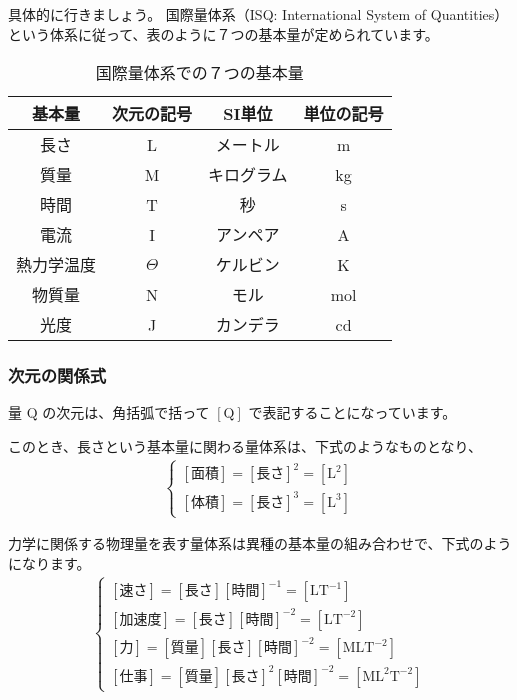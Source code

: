 \documentclass[uplatex,dvipdfmx,a4paper,11pt]{jsarticle}
\begin{document}
具体的に行きましょう。
国際量体系（ISQ: International System of Quantities）という体系に従って、表のように７つの基本量が定められています。
\begin{table}[htb]
	\begin{center}
		\caption{国際量体系での７つの基本量}
		\label{tab:kihon}
		\begin{tabular}{|c|c||c|c|} \hline
			基本量 		& 次元の記号 & SI単位\index{たんい@単位} 		& 単位の記号\\ \hline \hline
			長さ		& L			& メートル 		& m \\ \hline
			質量		& M			& キログラム 	& kg \\ \hline
			時間		& T			& 秒 			& s \\ \hline
			電流		& I			& アンペア 		& A \\ \hline
			熱力学温度	& $\Theta$	& ケルビン 		& K \\ \hline
			物質量		& N			& モル 			& mol \\ \hline
			光度		& J			& カンデラ 		& cd \\ \hline
		\end{tabular}
	\end{center}
\end{table}

\subsubsection{次元の関係式}
量 $\mathrm{Q}$ の次元は、角括弧で括って $[\mathrm{Q}]$ で表記することになっています。

このとき、長さという基本量に関わる量体系は、下式のようなものとなり、
\begin{align*}
	\begin{cases}
		[\text{面積}] = [\text{長さ}]^2 = [\mathrm{L}^2] \\[8pt]
		[\text{体積}] = [\text{長さ}]^3 = [\mathrm{L}^3]
	\end{cases}
\end{align*}

力学に関係する物理量を表す量体系は異種の基本量の組み合わせで、下式のようになります。
\begin{align*}
	\begin{cases}
		[\text{速さ}] = [\text{長さ}][\text{時間}]^{-1} = [\mathrm{LT}^{-1}] \\[8pt]
		[\text{加速度}] = [\text{長さ}][\text{時間}]^{-2} = [\mathrm{LT}^{-2}] \\[8pt]
		[\text{力}] = [\text{質量}][\text{長さ}][\text{時間}]^{-2} = [\mathrm{MLT}^{-2}] \\[8pt]
		[\text{仕事}] = [\text{質量}][\text{長さ}]^2[\text{時間}]^{-2} = [\mathrm{ML}^2\mathrm{T}^{-2}]
	\end{cases}
\end{align*}
\end{document}
